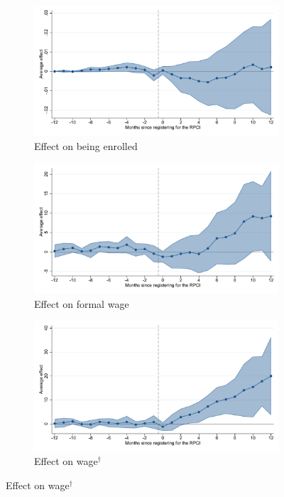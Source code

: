 \documentclass[oneside,11pt]{article}
\begin{document}
\begin{figure}[H]
    \centering
    \caption{Event studies - RPCI effect on enrollment and wages \label{fig:event_study_rpci}}
    
    \begin{subfigure}{0.49\textwidth}
    \caption{Effect on being enrolled}
    \includegraphics[width=\textwidth]{04_Figures/muestra_10porciento/event_study_alta_dcdh_connected.pdf}
    \end{subfigure}
    \begin{subfigure}{0.49\textwidth}
    \caption{Effect on formal wage}
    \includegraphics[width=\textwidth]{04_Figures/muestra_10porciento/event_study_sal_formal_dcdh_connected.pdf}
    \end{subfigure}
    
    \begin{subfigure}{0.49\textwidth}
    \caption{Effect on wage$^\dagger$}
    \includegraphics[width=\textwidth]{04_Figures/muestra_10porciento/event_study_sal_cierre_dcdh_connected.pdf}
    \end{subfigure}
    
\end{figure}
\end{document}
